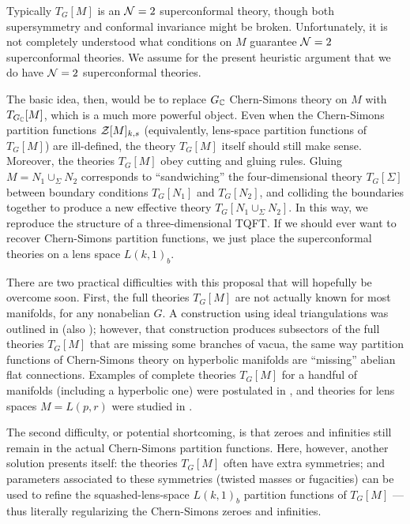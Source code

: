 \documentclass[12pt]{article}
\begin{document}
Typically $T_G[M]$ is an $\mathcal{N}=2$ superconformal theory, though both supersymmetry and conformal invariance might be broken. Unfortunately, it is not completely understood what conditions on $M$ guarantee $\mathcal{N}=2$ superconformal theories. We assume for the present heuristic argument that we do have $\mathcal{N}=2$ superconformal theories.

The basic idea, then, would be to replace $G_{\mathbb C}$ Chern-Simons theory on $M$ with $T_{G_{\mathbb C}}[M]$, which is a much more powerful object. Even when the Chern-Simons partition functions $\mathcal{Z}[M]_{k,s}$ (equivalently, lens-space partition functions of $T_G[M]$) are ill-defined, the theory $T_G[M]$ itself should still make sense. Moreover, the theories $T_G[M]$ obey cutting and gluing rules. Gluing $M=N_1\cup_\Sigma N_2$ corresponds to ``sandwiching'' the four-dimensional theory $T_G[\Sigma]$ between boundary conditions $T_G[N_1]$ and $T_G[N_2]$, and colliding  the boundaries together to produce a new effective theory $T_G[N_1\cup_\Sigma N_2]$. In this way, we reproduce the structure of a three-dimensional TQFT. If we should ever want to recover Chern-Simons partition functions, we just place the superconformal theories on a lens space $L(k,1)_b$.

There are two practical difficulties with this proposal that will hopefully be overcome soon. First, the full theories $T_G[M]$ are not actually known for most manifolds, for any nonabelian $G$. A construction using ideal triangulations was outlined in \cite{DIDGG, DIDGG-Kdec} (also \cite{DICCV, DICordova-tangles}); however, that construction produces subsectors of the full theories $T_G[M]$ that are missing some branches of vacua, the same way partition functions of Chern-Simons theory on hyperbolic manifolds are ``missing'' abelian flat connections. Examples of complete theories $T_G[M]$ for a handful of manifolds (including a hyperbolic one) were postulated in \cite{DICDGS}, and theories for lens spaces $M=L(p,r)$ were studied in \cite{DICDGS, DIGukovPei, DIPeiKe}.

The second difficulty, or potential shortcoming, is that zeroes and infinities still remain in the actual Chern-Simons partition functions. Here, however, another solution presents itself: the theories $T_G[M]$ often have extra symmetries; and parameters associated to these symmetries (twisted masses or fugacities) can be used to refine the squashed-lens-space $L(k,1)_b$ partition functions of $T_G[M]$ --- thus literally regularizing the Chern-Simons zeroes and infinities.
\end{document}
